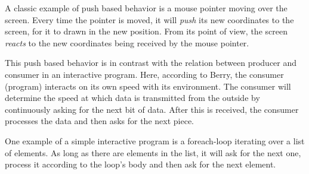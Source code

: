 A classic example of push based behavior is a mouse pointer moving over the screen. Every time the pointer is moved, it will \emph{push} its new coordinates to the screen, for it to drawn in the new position. From its point of view, the screen \emph{reacts} to the new coordinates being received by the mouse pointer.

This push based behavior is in contrast with the relation between producer and consumer in an interactive program. Here, according to Berry, the consumer (program) interacts on its own speed with its environment. The consumer will determine the speed at which data is transmitted from the outside by continuously asking for the next bit of data. After this is received, the consumer processes the data and then asks for the next piece.

One example of a simple interactive program is a foreach-loop iterating over a list of elements. As long as there are elements in the list, it will ask for the next one, process it according to the loop's body and then ask for the next element.